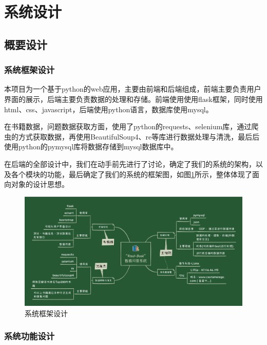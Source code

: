 \documentclass[twoside,11pt]{article}
\begin{document}
\newpage



\begin{center}
    \tableofcontents
\end{center}
\thispagestyle{empty}
\newpage





\section{系统设计}
\subsection{概要设计}
\subsubsection{系统框架设计}

本项目为一个基于python的web应用，主要由前端和后端组成，前端主要负责用户界面的展示，后端主要负责数据的处理和存储。前端使用使用flask框架，同时使用html、css、javascript，后端使用python语言，数据库使用mysql。

在书籍数据，问题数据获取方面，使用了python的requests、selenium库，通过爬虫的方式获取数据，再使用BeautifulSoup4、re等库进行数据处理与清洗，最后后使用python的pymysql库将数据存储到mysql数据库中。

在后端的全部设计中，我们在动手前先进行了讨论，确定了我们的系统的架构，以及各个模块的功能，最后确定了我们的系统的框架图，如图\ref{fig:fig1}所示，整体体现了面向对象的设计思想。

\begin{figure}[H]
    \centering
    \includegraphics[width=1\columnwidth]{figures/系统框架设计.jpg}
    \caption{系统框架设计}
    \label{fig:fig1}
\end{figure}
\subsubsection{系统功能设计}
\end{document}
